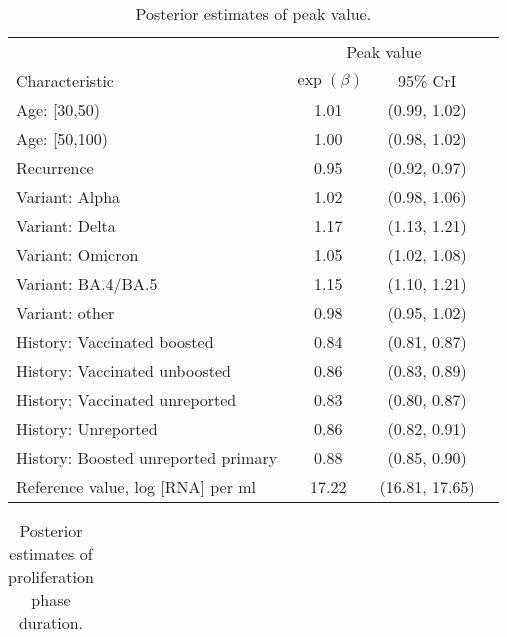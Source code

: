 
\begin{appendix}

    \renewcommand{\thefigure}{A\arabic{figure}}
    \setcounter{figure}{0}
    
    \renewcommand{\thetable}{A\arabic{table}}
    \setcounter{table}{0}
    
    \renewcommand{\theequation}{A\arabic{equation}}
    \setcounter{equation}{0}

    \newpage
    \begin{table}[p]
        \centering
        \caption{Posterior estimates of peak value.}
        \begin{tabular}{lccc}
        \toprule
         & \multicolumn{2}{c}{Peak value} \\
        Characteristic & $\exp(\beta)$ & 95\% CrI\\
        \midrule
         Age: [30,50) & 1.01 & (0.99, 1.02)\\
         Age: [50,100) & 1.00 & (0.98, 1.02)\\
         Recurrence & 0.95 & (0.92, 0.97)\\
         Variant: Alpha & 1.02 & (0.98, 1.06)\\
         Variant: Delta & 1.17 & (1.13, 1.21)\\
         Variant: Omicron & 1.05 & (1.02, 1.08)\\
         Variant: BA.4/BA.5 & 1.15 & (1.10, 1.21)\\
         Variant: other & 0.98 & (0.95, 1.02)\\
         History: Vaccinated boosted & 0.84 & (0.81, 0.87)\\
         History: Vaccinated unboosted & 0.86 & (0.83, 0.89)\\
         History: Vaccinated unreported & 0.83 & (0.80, 0.87)\\
         History: Unreported & 0.86 & (0.82, 0.91)\\
         History: Boosted unreported primary & 0.88 & (0.85, 0.90)\\
         \midrule
         Reference value, log [RNA] per ml & 17.22 & (16.81, 17.65)\\
         \bottomrule
        \end{tabular}
    \end{table}
    \begin{table}[p]
        \caption{Posterior estimates of proliferation phase duration.}
        \centering
        \begin{tabular}{lcc}

\end{tabular}
\end{table}
\end{appendix}
